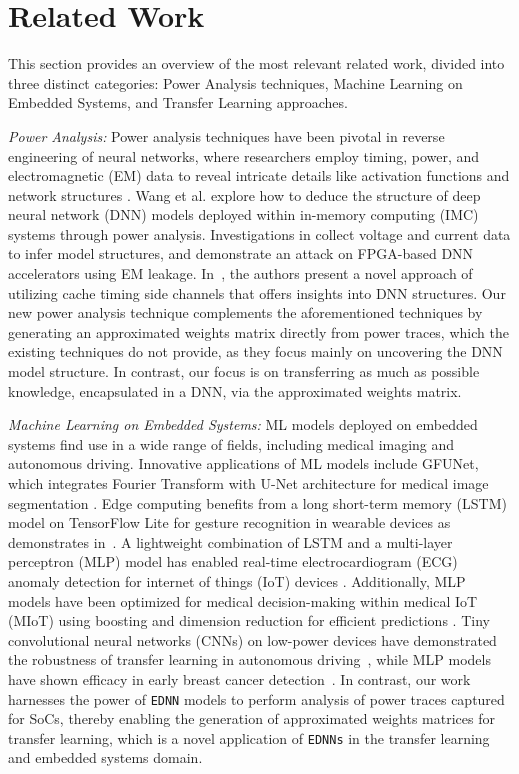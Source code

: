 \section{Related Work}
\label{sec:RelatedWork}
This section provides an overview of the most relevant related work, divided into three distinct categories: Power Analysis techniques, Machine Learning on Embedded Systems, and Transfer Learning approaches.

\emph{Power Analysis:}
Power analysis techniques have been pivotal in reverse engineering of neural networks, where researchers employ timing, power, and electromagnetic (EM) data to reveal intricate details like activation functions and network structures \cite{10.5555/3361338.3361374}. Wang et al. \cite{10077551} explore how to deduce the structure of deep neural network (DNN) models deployed within in-memory computing (IMC) systems through power analysis. Investigations in \cite{9000972} collect voltage and current data to infer model structures, and \cite{8735505} demonstrate an attack on FPGA-based DNN accelerators using EM leakage. In~\cite{10.1145/3195970.3196105}, the authors present a novel approach of utilizing cache timing side channels that offers insights into DNN structures. Our new power analysis technique complements the aforementioned techniques by generating an approximated weights matrix directly from power traces, which the existing techniques do not provide, as they focus mainly on uncovering the DNN model structure. In contrast, our focus is on transferring as much as possible knowledge, encapsulated in a DNN, via the approximated weights matrix. 

\emph{Machine Learning on Embedded Systems:}
ML models deployed on embedded systems find use in a wide range of fields, including medical imaging and autonomous driving. Innovative applications of ML models include GFUNet, which integrates Fourier Transform with U-Net architecture for medical image segmentation \cite{LI2023107290}. Edge computing benefits from a long short-term memory (LSTM) model on TensorFlow Lite for gesture recognition in wearable devices as demonstrates in~\cite{9399005}. A lightweight combination of LSTM and a multi-layer perceptron (MLP) model has enabled real-time electrocardiogram (ECG) anomaly detection for internet of things (IoT) devices \cite{9669005}. Additionally, MLP models have been optimized for medical decision-making within medical IoT (MIoT) using boosting and dimension reduction for efficient predictions \cite{LEE202015}. Tiny convolutional neural networks (CNNs) on low-power devices have demonstrated the robustness of transfer learning in autonomous driving~\cite{Rana_2023}, while MLP models have shown efficacy in early breast cancer detection~\cite{Rana_2023}. In contrast, our work harnesses the power of \texttt{EDNN} models to perform analysis of power traces captured for SoCs, thereby enabling the generation of approximated weights matrices for transfer learning, which is a novel application of \texttt{EDNNs} in the transfer learning and embedded systems domain.

